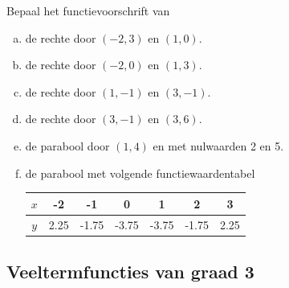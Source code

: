 \documentclass[12pt,twoside,a4paper]{article}
\begin{document}
\begin{oefening}
Bepaal het functievoorschrift van
\begin{enumerate}[(a)]
  \itemsep.8em
  \item de rechte door $(-2, 3)$ en $(1, 0)$.
  \item de rechte door $(-2, 0)$ en $(1, 3)$.
  \item de rechte door $(1, -1)$ en $(3, -1)$.
  \item de rechte door $(3, -1)$ en $(3, 6)$.
  \item de parabool door $(1,4)$ en met nulwaarden 2 en 5.
  \item de parabool met volgende functiewaardentabel
  \begin{center}
    \begin{tabular}{c|cccccc}
    $x$ & -2 & -1 & 0 & 1 & 2 & 3\\
    \hline
    $y$ & 2.25 & -1.75 & -3.75 & -3.75 & -1.75 & 2.25
    \end{tabular}
  \end{center}
\end{enumerate}
\end{oefening}

\subsection{Veeltermfuncties van graad 3}
\end{document}
